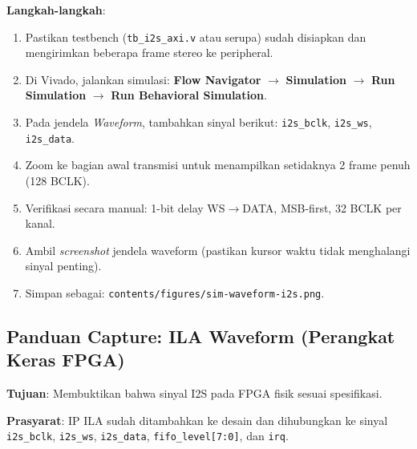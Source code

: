\textbf{Langkah-langkah}:
\begin{enumerate}
    \item Pastikan testbench (\texttt{tb\_i2s\_axi.v} atau serupa) sudah disiapkan dan mengirimkan beberapa frame stereo ke peripheral.
    \item Di Vivado, jalankan simulasi: \textbf{Flow Navigator} $\rightarrow$ \textbf{Simulation} $\rightarrow$ \textbf{Run Simulation} $\rightarrow$ \textbf{Run Behavioral Simulation}.
    \item Pada jendela \textit{Waveform}, tambahkan sinyal berikut: \texttt{i2s\_bclk}, \texttt{i2s\_ws}, \texttt{i2s\_data}.
    \item Zoom ke bagian awal transmisi untuk menampilkan setidaknya 2 frame penuh (128 BCLK).
    \item Verifikasi secara manual: 1-bit delay WS$\rightarrow$DATA, MSB-first, 32 BCLK per kanal.
    \item Ambil \textit{screenshot} jendela waveform (pastikan kursor waktu tidak menghalangi sinyal penting).
    \item Simpan sebagai: \texttt{contents/figures/sim-waveform-i2s.png}.
\end{enumerate}

\subsection{Panduan Capture: ILA Waveform (Perangkat Keras FPGA)}

\textbf{Tujuan}: Membuktikan bahwa sinyal I2S pada FPGA fisik sesuai spesifikasi.

\textbf{Prasyarat}: IP ILA sudah ditambahkan ke desain dan dihubungkan ke sinyal \texttt{i2s\_bclk}, \texttt{i2s\_ws}, \texttt{i2s\_data}, \texttt{fifo\_level[7:0]}, dan \texttt{irq}.

